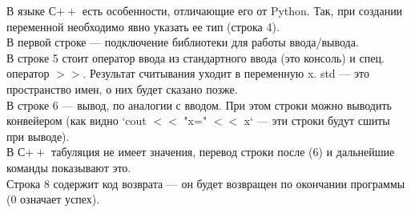 \begin{lecture}[\lectureSubject]
\begin{lecSection}
\begin{enumerate}
		\end{enumerate}
	\end{lecSection}
	\begin{lecSection}[Синтаксис]
		В языке С$++$ есть особенности, отличающие его от Python. Так, при создании переменной необходимо явно указать ее тип (строка 4).\\
		В первой строке --- подключение библиотеки для работы ввода/вывода.\\
		В строке 5 стоит оператор ввода из стандартного ввода (это консоль) и спец. оператор $>>$. Результат считывания уходит в переменную x. std --- это пространство имен, о них будет сказано позже. \\
		В строке 6 --- вывод, по аналогии с вводом. При этом строки можно выводить конвейером (как видно `cout $<<$ "x=" $<<$ x` --- эти строки будут сшиты при выводе).\\
		В С$++$ табуляция не имеет значения, перевод строки после (6) и дальнейшие команды показывают это. \\
		Строка 8 содержит код возврата --- он будет возвращен по окончании программы (0 означает успех).
		 

\end{lecSection}
\end{lecture}
